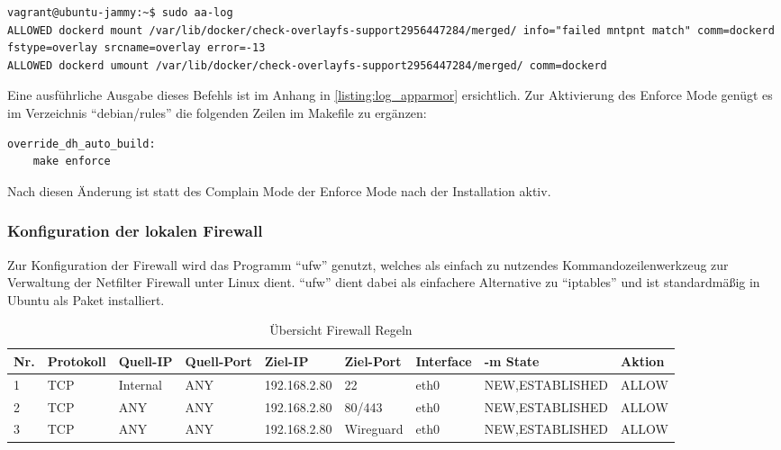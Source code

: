\begin{verbatim}
vagrant@ubuntu-jammy:~$ sudo aa-log 
ALLOWED dockerd mount /var/lib/docker/check-overlayfs-support2956447284/merged/ info="failed mntpnt match" comm=dockerd fstype=overlay srcname=overlay error=-13
ALLOWED dockerd umount /var/lib/docker/check-overlayfs-support2956447284/merged/ comm=dockerd
\end{verbatim}

Eine ausführliche Ausgabe dieses Befehls ist im Anhang in \autoref{listing:log_apparmor} ersichtlich. Zur Aktivierung des Enforce Mode genügt es im Verzeichnis \enquote{debian/rules} die folgenden Zeilen im Makefile zu ergänzen:

\begin{verbatim}
override_dh_auto_build:
    make enforce
\end{verbatim}

Nach diesen Änderung ist statt des Complain Mode der Enforce Mode nach der Installation aktiv.

\subsubsection{Konfiguration der lokalen Firewall}

Zur Konfiguration der Firewall wird das Programm \enquote{ufw} genutzt, welches als einfach zu nutzendes Kommandozeilenwerkzeug zur Verwaltung der Netfilter Firewall unter Linux dient. \enquote{ufw} dient dabei als einfachere Alternative zu \enquote{iptables} und ist standardmäßig in Ubuntu als Paket installiert.

\begin{table}[!ht]
    \centering
    \begin{adjustbox}{width=\textwidth}

    \begin{tabular}{|l|l|l|l|l|l|l|l|l|}
        \hline
            Nr. & Protokoll & Quell-IP & Quell-Port & Ziel-IP & Ziel-Port & Interface & -m State & Aktion \\ \hline
            1 & TCP & Internal & ANY & 192.168.2.80 & 22 & eth0 & NEW,ESTABLISHED & ALLOW \\ \hline
            2 & TCP & ANY & ANY & 192.168.2.80 & 80/443 & eth0 & NEW,ESTABLISHED & ALLOW \\ \hline
            3 & TCP & ANY & ANY & 192.168.2.80 & Wireguard & eth0 & NEW,ESTABLISHED & ALLOW \\ \hline
        \end{tabular}
    \end{adjustbox}
    \caption{Übersicht Firewall Regeln}
    \label{regeln_fw_incoming}
\end{table}

